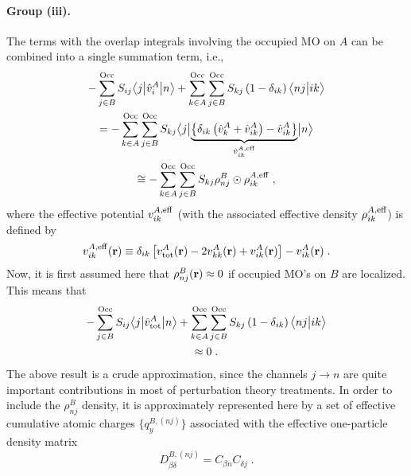\paragraph{Group (iii).}
The terms with the overlap integrals involving the occupied MO on $A$
can be combined into a single summation term, i.e.,
\begin{multline} \label{e:ct.group-iii}
       - \sum_{j\in B}^{\rm Occ} S_{ij} \tBraKet{j}{\hat{v}^A_{i} }{n}  
     + \sum_{k\in A}^{\rm Occ} \sum_{j\in B}^{\rm Occ}  
        S_{kj} \left( 1 - \delta_{ik} \right)
        \BraKet{nj}{ik} \\ = -
 \sum_{k\in A}^{\rm Occ} 
 \sum_{j\in B}^{\rm Occ}
 S_{kj} 
 \tBraKet{j}{
 \underbrace{
 \left\{ 
  \delta_{ik} \left( \hat{v}^A_{k} + \hat{v}^A_{ik} \right)   - \hat{v}^A_{ik}
 \right\} 
  }_{\hat{v}^{A,{\rm eff}}_{ik}}
 }{n}  \\ \cong -
%
  \sum_{k\in A}^{\rm Occ} 
 \sum_{j\in B}^{\rm Occ}
 S_{kj} 
 \rho_{nj}^B \odot \rho^{A,{\rm eff}}_{ik} \;,
\end{multline}
%
where the effective potential ${v}^{A,{\rm eff}}_{ik}$ (with the associated 
effective density $\rho^{A,{\rm eff}}_{ik}$) 
is defined by
%
\begin{equation} \label{e:ct.group-iii.oep}
 {v}^{A,{\rm eff}}_{ik}({\bf r}) \equiv
 \delta_{ik} 
 \left[
  v^A_{\rm tot} ({\bf r}) - 2 v^A_{kk} ({\bf r}) + v^A_{ik} ({\bf r})
 \right] 
  - v^A_{ik} ({\bf r}) \;.
\end{equation}
%
Now, it is first assumed here that $\rho^{B}_{nj} ({\bf r}) \approx 0$ if occupied MO's on $B$ are localized.
This means that
%
\begin{multline} \label{e:ct.group-iii.final.a}
        - \sum_{j\in B}^{\rm Occ} S_{ij} \bigl\langle {j} \bigl\lvert {\hat{v}^A_{\rm tot} } \bigl\lvert {n} \bigr\rangle  
     + \sum_{k\in A}^{\rm Occ} \sum_{j\in B}^{\rm Occ}  
        S_{kj} \left( 1 - \delta_{ik} \right)
        \bigl\langle {nj} \bigl\lvert {ik} \bigr\rangle \\ 
    \approx 0 \;.
\end{multline}
%
The above result is a crude approximation, since the channels $j\rightarrow n$
are quite important contributions in most of perturbation theory treatments.
In order to include the $\rho^{B}_{nj}$ density, it is approximately represented here by a set of effective 
cumulative
atomic charges $\{ q^{B,(nj)}_{y} \}$ associated with the effective one\hyp{}particle density matrix
%
\begin{equation} \label{e:oed-group-iii}
 D^{B,(nj)}_{\beta\delta} = C_{\beta n} C_{\delta j} \;.
\end{equation}
